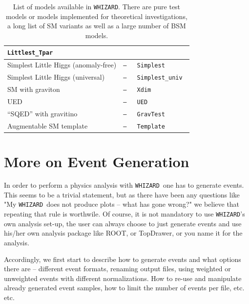 \documentclass[12pt]{book}
\newcommand{\whizard}{\texttt{WHIZARD}}
\begin{document}
\begin{table}
\begin{center}
\begin{tabular}{|l|l|l|}
             \tt{Littlest\_Tpar} \\
             \hline
             Simplest Little Higgs (anomaly-free) &  \tt{---} &
             \tt{Simplest} \\
             \hline
             Simplest Little Higgs (universal) &  \tt{---} &
             \tt{Simplest\_univ} \\
             \hline\hline
             SM with graviton & \tt{---} & \tt{Xdim} \\
             \hline
             UED & \tt{---} & \tt{UED} \\
             \hline
             ``SQED'' with gravitino & \tt{---} & \tt{GravTest} \\
             \hline
             Augmentable SM template & \tt{---} & \tt{Template} \\
             \hline
           \end{tabular}
         \end{center}
	\caption{\label{tab:models} List of models available in
          \whizard. There are pure test models or models implemented 
          for theoretical investigations, a long list of SM variants
          as well as a large number of BSM models.}
\end{table}


\chapter{More on Event Generation}
\label{sec:events}

In order to perform a physics analysis with \whizard\ one has to
generate events. This seems to be a trivial statement, but as there
have been any questions like "My \whizard\ does not produce plots --
what has gone wrong?" we believe that repeating that rule is
worthwile. Of course, it is not mandatory to use \whizard's own analysis
set-up, the user can always choose to just generate events and use
his/her own analysis package like ROOT, or TopDrawer, or you name it
for the analysis. 

Accordingly, we first start to describe how to generate events and
what options there are -- different event formats, renaming output
files, using weighted or unweighted events with different
normalizations. How to re-use and manipulate already generated event
samples, how to limit the number of events per file, etc. etc.
\end{document}
